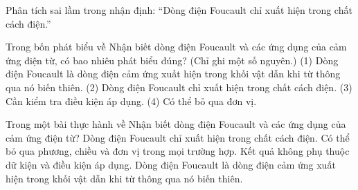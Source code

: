 \begin{bt}
Phân tích sai lầm trong nhận định: “Dòng điện Foucault chỉ xuất hiện trong chất cách điện.”
\end{bt}

\begin{ex}
Trong bốn phát biểu về Nhận biết dòng điện Foucault và các ứng dụng của cảm ứng điện từ, có bao nhiêu phát biểu đúng? (Chỉ ghi một số nguyên.) (1) Dòng điện Foucault là dòng điện cảm ứng xuất hiện trong khối vật dẫn khi từ thông qua nó biến thiên. (2) Dòng điện Foucault chỉ xuất hiện trong chất cách điện. (3) Cần kiểm tra điều kiện áp dụng. (4) Có thể bỏ qua đơn vị.
\end{ex}

\begin{ex}
Trong một bài thực hành về Nhận biết dòng điện Foucault và các ứng dụng của cảm ứng điện từ?
\choice
{Dòng điện Foucault chỉ xuất hiện trong chất cách điện.}
{Có thể bỏ qua phương, chiều và đơn vị trong mọi trường hợp.}
{Kết quả không phụ thuộc dữ kiện và điều kiện áp dụng.}
{\True Dòng điện Foucault là dòng điện cảm ứng xuất hiện trong khối vật dẫn khi từ thông qua nó biến thiên.}
\end{ex}

